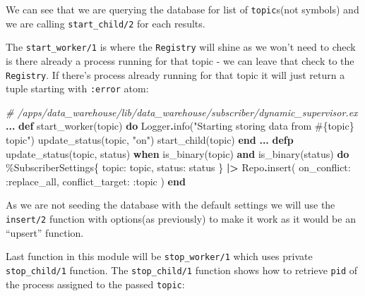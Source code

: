 \documentclass[
  oneside]{book}
\newenvironment{Shaded}{\begin{snugshade}}{\end{snugshade}}
\newcommand{\CommentTok}[1]{\textcolor[rgb]{0.56,0.35,0.01}{\textit{#1}}}
\newcommand{\ConstantTok}[1]{\textcolor[rgb]{0.00,0.00,0.00}{#1}}
\newcommand{\KeywordTok}[1]{\textcolor[rgb]{0.13,0.29,0.53}{\textbf{#1}}}
\newcommand{\NormalTok}[1]{#1}
\newcommand{\OperatorTok}[1]{\textcolor[rgb]{0.81,0.36,0.00}{\textbf{#1}}}
\newcommand{\OtherTok}[1]{\textcolor[rgb]{0.56,0.35,0.01}{#1}}
\newcommand{\StringTok}[1]{\textcolor[rgb]{0.31,0.60,0.02}{#1}}
\newcommand{\VariableTok}[1]{\textcolor[rgb]{0.00,0.00,0.00}{#1}}
\begin{document}
We can see that we are querying the database for list of \texttt{topic}s(not symbols) and we are calling \texttt{start\_child/2} for each results.

The \texttt{start\_worker/1} is where the \texttt{Registry} will shine as we won't need to check is there already a process running for that topic - we can leave that check to the \texttt{Registry}. If there's process already running for that topic it will just return a tuple starting with \texttt{:error} atom:

\begin{Shaded}
\begin{Highlighting}[]
  \CommentTok{\# /apps/data\_warehouse/lib/data\_warehouse/subscriber/dynamic\_supervisor.ex}
  \OperatorTok{...}
  \KeywordTok{def}\NormalTok{ start\_worker(topic) }\KeywordTok{do}
    \ConstantTok{Logger}\OperatorTok{.}\NormalTok{info(}\StringTok{"Starting storing data from }\OtherTok{\#\{}\NormalTok{topic}\OtherTok{\}}\StringTok{ topic"}\NormalTok{)}
\NormalTok{    update\_status(topic, }\StringTok{"on"}\NormalTok{)}
\NormalTok{    start\_child(topic)}
  \KeywordTok{end}
  \OperatorTok{...}
  \KeywordTok{defp}\NormalTok{ update\_status(topic, status)}
       \KeywordTok{when}\NormalTok{ is\_binary(topic) }\KeywordTok{and}\NormalTok{ is\_binary(status) }\KeywordTok{do}
\NormalTok{    \%}\ConstantTok{SubscriberSettings}\NormalTok{\{}
      \VariableTok{topic:}\NormalTok{ topic,}
      \VariableTok{status:}\NormalTok{ status}
\NormalTok{    \}}
    \OperatorTok{|\textgreater{}} \ConstantTok{Repo}\OperatorTok{.}\NormalTok{insert(}
      \VariableTok{on\_conflict:} \VariableTok{:replace\_all}\NormalTok{,}
      \VariableTok{conflict\_target:} \VariableTok{:topic}
\NormalTok{    )}
  \KeywordTok{end}
\end{Highlighting}
\end{Shaded}

As we are not seeding the database with the default settings we will use the \texttt{insert/2} function with options(as previously) to make it work as it would be an ``upsert'' function.

Last function in this module will be \texttt{stop\_worker/1} which uses private \texttt{stop\_child/1} function. The \texttt{stop\_child/1} function shows how to retrieve \texttt{pid} of the process assigned to the passed \texttt{topic}:
\end{document}
